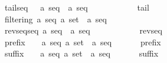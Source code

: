 \begin{isabellebody}
\ \ {\isachardoublequoteopen}{\isacharasterisk}tailseq{\isachardoublequoteclose}\ \ \ {\isacharcolon}{\isacharcolon}{\isachardoublequoteopen}{\isacharparenleft}{\isacharprime}a\ seq{\isacharparenright}\ {\isacharequal}{\isachargreater}\ {\isacharparenleft}{\isacharprime}a\ seq{\isacharparenright}{\isachardoublequoteclose}\ \ \ \ \ \ \ \ \ \ \ {\isacharparenleft}{\isachardoublequoteopen}{\isacharparenleft}{}\ tail\ {\isacharunderscore}{\isacharparenright}{\isachardoublequoteclose}\ {}{}{\isacharparenright}\isanewline
\ \ {\isachardoublequoteopen}{\isacharasterisk}filtering{\isachardoublequoteclose}\ {\isacharcolon}{\isacharcolon}{\isachardoublequoteopen}{\isacharbrackleft}{\isacharprime}a\ seq{\isacharcomma}\ {\isacharprime}a\ set{\isacharbrackright}\ {\isacharequal}{\isachargreater}\ {\isacharprime}a\ seq{\isachardoublequoteclose}\ \ \ \ \ {\isacharparenleft}{\isachardoublequoteopen}{\isacharparenleft}{}\ {\isacharunderscore}\ {\isacharpercent}{\isacharbar}{\isacharbackquote}{\isacharslash}\ {\isacharunderscore}{\isacharparenright}{\isachardoublequoteclose}\ {\isacharbrackleft}{}{}{\isacharcomma}{}{}{\isacharbrackright}\ {}{}{\isacharparenright}\isanewline
\ \ {\isachardoublequoteopen}{\isacharasterisk}revseqseq{\isachardoublequoteclose}\ {\isacharcolon}{\isacharcolon}{\isachardoublequoteopen}{\isacharparenleft}{\isacharprime}a\ seq{\isacharparenright}\ {\isacharequal}{\isachargreater}\ {\isacharparenleft}{\isacharprime}a\ seq{\isacharparenright}{\isachardoublequoteclose}\ \ \ \ \ \ \ \ \ \ \ {\isacharparenleft}{\isachardoublequoteopen}{\isacharparenleft}{}\ revseq\ {\isacharunderscore}{\isacharparenright}{\isachardoublequoteclose}\ {}{}{\isacharparenright}\ \isanewline
\ \ {\isachardoublequoteopen}{\isacharasterisk}prefix{\isachardoublequoteclose}\ \ \ \ {\isacharcolon}{\isacharcolon}{\isachardoublequoteopen}{\isacharbrackleft}{\isacharprime}a\ seq{\isacharcomma}\ {\isacharprime}a\ set{\isacharbrackright}\ {\isacharequal}{\isachargreater}\ {\isacharprime}a\ seq{\isachardoublequoteclose}\ \ \ \ \ {\isacharparenleft}{\isachardoublequoteopen}{\isacharparenleft}{}\ {\isacharunderscore}\ prefix{\isacharslash}\ {\isacharunderscore}{\isacharparenright}{\isachardoublequoteclose}\ {\isacharbrackleft}{}{}{\isacharcomma}{}{}{\isacharbrackright}\ {}{}{\isacharparenright}\isanewline
\ \ {\isachardoublequoteopen}{\isacharasterisk}suffix{\isachardoublequoteclose}\ \ \ \ {\isacharcolon}{\isacharcolon}{\isachardoublequoteopen}{\isacharbrackleft}{\isacharprime}a\ seq{\isacharcomma}\ {\isacharprime}a\ set{\isacharbrackright}\ {\isacharequal}{\isachargreater}\ {\isacharprime}a\ seq{\isachardoublequoteclose}\ \ \ \ \ {\isacharparenleft}{\isachardoublequoteopen}{\isacharparenleft}{}\ {\isacharunderscore}\ suffix{\isacharslash}\ {\isacharunderscore}{\isacharparenright}{\isachardoublequoteclose}\ {\isacharbrackleft}{}{}{\isacharcomma}{}{}{\isacharbrackright}\ {}{}{\isacharparenright}\isanewline

\end{isabellebody}
